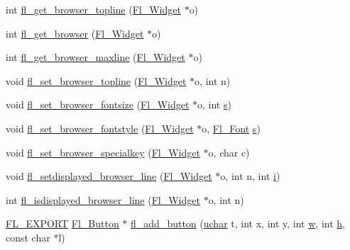 \begin{DoxyCompactItemize}
\item 
int \hyperlink{forms_8_h_a484b024bc702a6d637817a7b3c223c45}{fl\+\_\+get\+\_\+browser\+\_\+topline} (\hyperlink{class_fl___widget}{Fl\+\_\+\+Widget} $\ast$o)
\item 
int \hyperlink{forms_8_h_a0785067d81de08b1590e6d82fd63a3c2}{fl\+\_\+get\+\_\+browser} (\hyperlink{class_fl___widget}{Fl\+\_\+\+Widget} $\ast$o)
\item 
int \hyperlink{forms_8_h_a8f31f51d65aa08144bb5f051a0bed3e5}{fl\+\_\+get\+\_\+browser\+\_\+maxline} (\hyperlink{class_fl___widget}{Fl\+\_\+\+Widget} $\ast$o)
\item 
void \hyperlink{forms_8_h_ae8993255ac98fd4a7c20c3658953770f}{fl\+\_\+set\+\_\+browser\+\_\+topline} (\hyperlink{class_fl___widget}{Fl\+\_\+\+Widget} $\ast$o, int n)
\item 
void \hyperlink{forms_8_h_a34d28e9804a02dcae2c4e33b617a9495}{fl\+\_\+set\+\_\+browser\+\_\+fontsize} (\hyperlink{class_fl___widget}{Fl\+\_\+\+Widget} $\ast$o, int \hyperlink{forms_8_h_a672b4f0a8c8a6db61068c721f799d87f}{s})
\item 
void \hyperlink{forms_8_h_a540ffb1f500e317ee8312d146fdd1393}{fl\+\_\+set\+\_\+browser\+\_\+fontstyle} (\hyperlink{class_fl___widget}{Fl\+\_\+\+Widget} $\ast$o, \hyperlink{_enumerations_8_h_a2ac46d9f082834b969fffe490a03a709}{Fl\+\_\+\+Font} \hyperlink{forms_8_h_a672b4f0a8c8a6db61068c721f799d87f}{s})
\item 
void \hyperlink{forms_8_h_a4cc039a4964ee6bd5acaf5a182235b8d}{fl\+\_\+set\+\_\+browser\+\_\+specialkey} (\hyperlink{class_fl___widget}{Fl\+\_\+\+Widget} $\ast$o, char c)
\item 
void \hyperlink{forms_8_h_a756b7f3c6d6f4d64e26915b05c4f2057}{fl\+\_\+setdisplayed\+\_\+browser\+\_\+line} (\hyperlink{class_fl___widget}{Fl\+\_\+\+Widget} $\ast$o, int n, int \hyperlink{forms_8_h_acb559820d9ca11295b4500f179ef6392}{i})
\item 
int \hyperlink{forms_8_h_a82056a1386baa1c299ec8bfb24b671d5}{fl\+\_\+isdisplayed\+\_\+browser\+\_\+line} (\hyperlink{class_fl___widget}{Fl\+\_\+\+Widget} $\ast$o, int n)
\item 
\hyperlink{_fl___export_8_h_aa9ba29a18aee9d738370a06eeb4470fc}{F\+L\+\_\+\+E\+X\+P\+O\+RT} \hyperlink{class_fl___button}{Fl\+\_\+\+Button} $\ast$ \hyperlink{forms_8_h_a53e2dc13e86fec2ee78ffc6bf29dd43d}{fl\+\_\+add\+\_\+button} (\hyperlink{fl__types_8h_a65f85814a8290f9797005d3b28e7e5fc}{uchar} t, int x, int y, int \hyperlink{forms_8_h_aac374e320caaadeca4874add33b62af2}{w}, int \hyperlink{forms_8_h_a7e427ba5b307f9068129699250690066}{h}, const char $\ast$l)

\end{DoxyCompactItemize}

